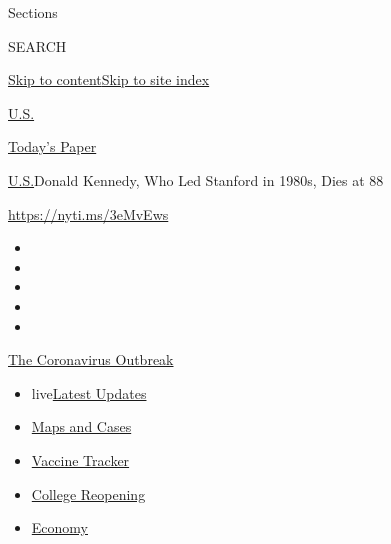 Sections

SEARCH

\protect\hyperlink{site-content}{Skip to
content}\protect\hyperlink{site-index}{Skip to site index}

\href{https://www.nytimes.com/section/us}{U.S.}

\href{https://myaccount.nytimes.com/auth/login?response_type=cookie\&client_id=vi}{}

\href{https://www.nytimes.com/section/todayspaper}{Today's Paper}

\href{/section/us}{U.S.}\textbar{}Donald Kennedy, Who Led Stanford in
1980s, Dies at 88

\url{https://nyti.ms/3eMvEws}

\begin{itemize}
\item
\item
\item
\item
\item
\end{itemize}

\href{https://www.nytimes.com/news-event/coronavirus?action=click\&pgtype=Article\&state=default\&region=TOP_BANNER\&context=storylines_menu}{The
Coronavirus Outbreak}

\begin{itemize}
\tightlist
\item
  live\href{https://www.nytimes.com/2020/08/03/world/coronavirus-covid-19.html?action=click\&pgtype=Article\&state=default\&region=TOP_BANNER\&context=storylines_menu}{Latest
  Updates}
\item
  \href{https://www.nytimes.com/interactive/2020/us/coronavirus-us-cases.html?action=click\&pgtype=Article\&state=default\&region=TOP_BANNER\&context=storylines_menu}{Maps
  and Cases}
\item
  \href{https://www.nytimes.com/interactive/2020/science/coronavirus-vaccine-tracker.html?action=click\&pgtype=Article\&state=default\&region=TOP_BANNER\&context=storylines_menu}{Vaccine
  Tracker}
\item
  \href{https://www.nytimes.com/2020/08/02/us/covid-college-reopening.html?action=click\&pgtype=Article\&state=default\&region=TOP_BANNER\&context=storylines_menu}{College
  Reopening}
\item
  \href{https://www.nytimes.com/live/2020/08/03/business/stock-market-today-coronavirus?action=click\&pgtype=Article\&state=default\&region=TOP_BANNER\&context=storylines_menu}{Economy}
\end{itemize}

